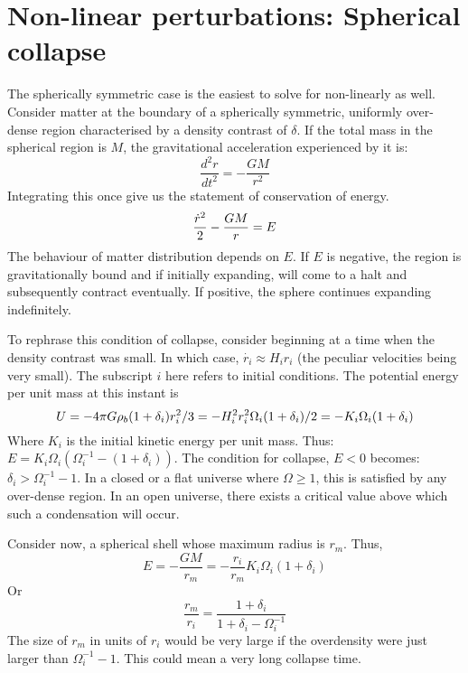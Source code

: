 \documentclass[12pt,a4paper,oneside]{book}
\begin{document}
	\section{Non-linear perturbations: Spherical collapse}
		The spherically symmetric case is the easiest to solve for non-linearly as well. Consider matter at the boundary of a spherically symmetric, uniformly over-dense region characterised by a density contrast of $\delta$. If the total mass in the spherical region is $M$, the gravitational acceleration experienced by it is:
		$$
			\frac{d^2r}{dt^2}=-\frac{GM}{r^2}
		$$
		Integrating this once give us the statement of conservation of energy.
		\begin{equation}
			\frac{\dot{r}^2}{2}-\frac{GM}{r}=E\\
			\label{eq:energy_sphere}
		\end{equation}
		The behaviour of matter distribution depends on $E$. If $E$ is negative, the region is gravitationally bound and if initially expanding, will come to a halt and subsequently contract eventually. If positive, the sphere continues expanding indefinitely.
		
		To rephrase this condition of collapse, consider beginning at a time when the density contrast was small. In which case, $\dot{r_i}\approx H_ir_i$ (the peculiar velocities being very small). The subscript $i$ here refers to initial conditions. The potential energy per unit mass at this instant is 
		$$
		U=-4\pi G\rho_b(1+\delta_i)r_i^2/3=-H_i^2r_i^2\Omega_i(1+\delta_i)/2=-K_i\Omega_i(1+\delta_i)\\
		$$
		Where $K_i$ is the initial kinetic energy per unit mass. Thus:
		$E=K_i\Omega_i(\Omega_i^{-1}-(1+\delta_i))$. The condition for collapse, $E<0$ becomes: $\delta_i>\Omega_i^{-1}-1$. In a closed or a flat universe where $\Omega\geq1$, this is satisfied by any over-dense region. In an open universe, there exists a critical value above which such a condensation will occur.
		
		Consider now, a spherical shell whose maximum radius is $r_m$. Thus,
		$$
			E=-\frac{GM}{r_m}=-\frac{r_i}{r_m}K_i\Omega_i(1+\delta_i)
		$$
		Or
		$$
			\frac{r_m}{r_i}=\frac{1+\delta_i}{1+\delta_i-\Omega_i^{-1}}
		$$
		The size of $r_m$ in units of $r_i$ would be very large if the overdensity were just larger than $\Omega_i^{-1}-1$. This could mean a very long collapse time.
		
\end{document}
